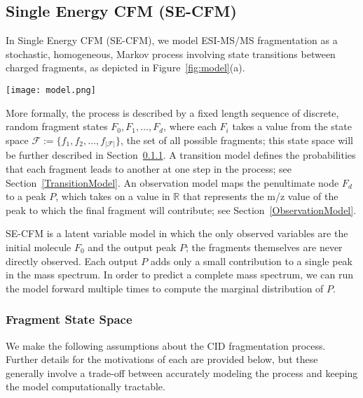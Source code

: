 \subsection{Single Energy CFM (SE-CFM)}
\label{sec:SE}

In Single Energy CFM (SE-CFM), we model ESI-MS/MS fragmentation as a stochastic, homogeneous, Markov process \citep{Cappe2005} involving state transitions between charged fragments, as depicted in Figure~\ref{fig:model}(a).
\begin{figure*}
\begin{center}
\texttt{[image: model.png]}
\caption{(a) Single Energy Competitive Fragmentation Model (SE-CFM): a stochastic, Markov process of state transitions between charged fragments. (b) Combined Energy Competitive Fragmentation Model (CE-CFM): an extension of SE-CFM that combines information from multiple collision energy spectra into one model. }\label{model}
\label{fig:model}
\end{center}
\end{figure*}

More formally, the process is described by a fixed length sequence of discrete, random fragment states $F_{0}, F_{1}, \dots, F_{d}$, where each $F_{i}$ takes a value from the state space
$\mathcal{F} := \{f_{1},f_{2},\dots, f_{|\mathcal{F}|}\}$, 
the set of all possible fragments; this state space will be further described in Section~\ref{StateSpace}.
A transition model defines the probabilities that each fragment leads to another at one step in the process; see Section~\ref{TransitionModel}. 
An observation model maps the penultimate node $F_{d}$ to a peak $P$, which takes on a value in $\mathbb{R}$ that represents the m/z value of the peak to which the final fragment will contribute; see Section~\ref{ObservationModel}. 

SE-CFM is a latent variable model in which the only observed variables are the initial molecule $F_{0}$ and the output peak $P$; the fragments themselves are never directly observed. 
Each output $P$ adds only a small contribution to a single peak in the mass spectrum. In order to predict a complete mass spectrum, we can run the model forward multiple times to compute the marginal distribution of $P$.

\subsubsection{Fragment State Space}
\label{StateSpace}

We make the following assumptions about the CID fragmentation process. Further details for the motivations of each are provided below, but these generally involve a trade-off between accurately modeling the process and keeping the model computationally tractable.

